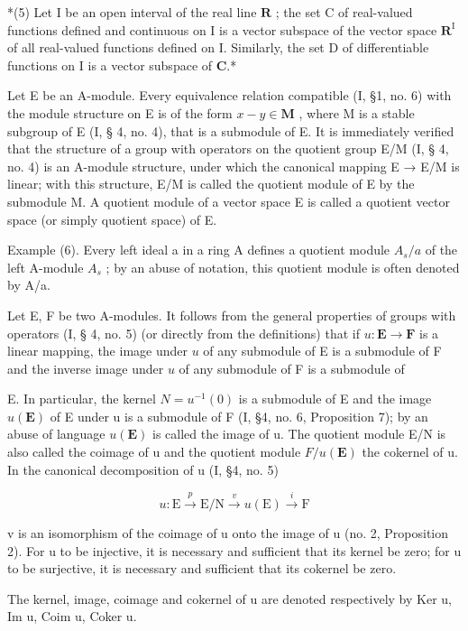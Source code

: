 *(5) Let I be an open interval of the real line \(\mathbf{R}\) ; the set C of real-valued functions defined and continuous on I is a vector subspace of the vector space \(\mathbf{R}^{\mathrm{I}}\) of all real-valued functions defined on I. Similarly, the set D of differentiable functions on I is a vector subspace of \(\mathbf{C}\).*

Let E be an A-module. Every equivalence relation compatible (I, §1, no. 6) with the module structure on E is of the form \(x - y \in \mathbf{M}\) , where M is a stable subgroup of E (I, § 4, no. 4), that is a submodule of E. It is immediately verified that the structure of a group with operators on the quotient group E/M (I, § 4, no. 4) is an A-module structure, under which the canonical mapping E → E/M is linear; with this structure, E/M is called the quotient module of E by the submodule M. A quotient module of a vector space E is called a quotient vector space (or simply quotient space) of E.

Example (6). Every left ideal a in a ring A defines a quotient module \(A_{s}/a\) of the left A-module \(A_{s}\) ; by an abuse of notation, this quotient module is often denoted by A/a.

Let E, F be two A-modules. It follows from the general properties of groups with operators (I, § 4, no. 5) (or directly from the definitions) that if \(u: \mathbf{E} \to \mathbf{F}\) is a linear mapping, the image under \(u\) of any submodule of E is a submodule of F and the inverse image under \(u\) of any submodule of F is a submodule of

E. In particular, the kernel \(N = u^{-1}(0)\) is a submodule of E and the image \(u(\mathbf{E})\) of E under u is a submodule of F (I, §4, no. 6, Proposition 7); by an abuse of language \(u(\mathbf{E})\) is called the image of u. The quotient module E/N is also called the coimage of u and the quotient module \(F/u(\mathbf{E})\) the cokernel of u. In the canonical decomposition of u (I, §4, no. 5)

\[
u: \mathrm{E} \xrightarrow {p} \mathrm{E} / \mathrm{N} \xrightarrow {v} u (\mathrm{E}) \xrightarrow {i} \mathrm{F}\tag{11}
\]

v is an isomorphism of the coimage of u onto the image of u (no. 2, Proposition 2). For u to be injective, it is necessary and sufficient that its kernel be zero; for u to be surjective, it is necessary and sufficient that its cokernel be zero.

The kernel, image, coimage and cokernel of u are denoted respectively by Ker u, Im u, Coim u, Coker u.

